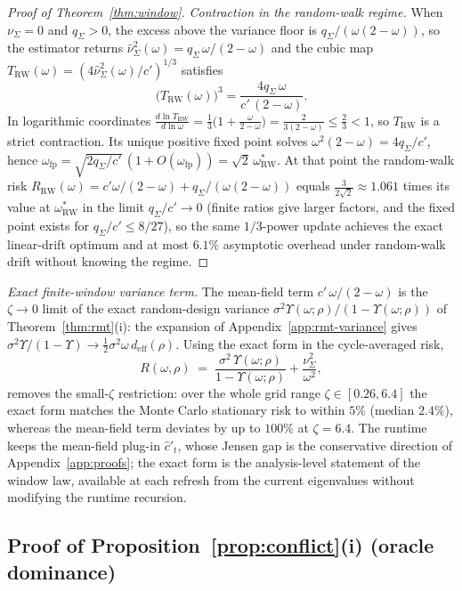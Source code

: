 \begin{proof}[Proof of Theorem~\ref{thm:window}]
\emph{Contraction in the random-walk regime.}
When $\nu_\Sigma = 0$ and $q_\Sigma > 0$, the excess above the variance floor is $q_\Sigma/(\omega(2-\omega))$, so the estimator returns $\widehat\nu^2_\Sigma(\omega) = q_\Sigma\,\omega/(2-\omega)$ and the cubic map $T_{\mathrm{RW}}(\omega) = (4\widehat\nu^2_\Sigma(\omega)/c')^{1/3}$ satisfies
\[
  \bigl(T_{\mathrm{RW}}(\omega)\bigr)^3 = \frac{4q_\Sigma\,\omega}{c'\,(2-\omega)}.
\]
In logarithmic coordinates $\frac{d\ln T_{\mathrm{RW}}}{d\ln \omega} = \frac13\bigl(1 + \frac{\omega}{2-\omega}\bigr) = \frac{2}{3(2-\omega)} \le \frac23 < 1$, so $T_{\mathrm{RW}}$ is a strict contraction.
Its unique positive fixed point solves $\omega^2(2-\omega) = 4q_\Sigma/c'$, hence $\omega_{\mathrm{fp}} = \sqrt{2q_\Sigma/c'}\,(1+O(\omega_{\mathrm{fp}})) = \sqrt2\,\omega^*_{\mathrm{RW}}$.
At that point the random-walk risk $R_{\mathrm{RW}}(\omega) = c'\omega/(2-\omega) + q_\Sigma/(\omega(2-\omega))$ equals $\frac{3}{2\sqrt2} \approx 1.061$ times its value at $\omega^*_{\mathrm{RW}}$ in the limit $q_\Sigma/c'\to 0$ (finite ratios give larger factors, and the fixed point exists for $q_\Sigma/c' \le 8/27$), so the same $1/3$-power update achieves the exact linear-drift optimum and at most $6.1\%$ asymptotic overhead under random-walk drift without knowing the regime.
\end{proof}

\medskip
\noindent\emph{Exact finite-window variance term.}
The mean-field term $c'\,\omega/(2-\omega)$ is the $\zeta \to 0$ limit of the exact random-design variance $\sigma^2\Upsilon(\omega;\rho)/(1-\Upsilon(\omega;\rho))$ of Theorem~\ref{thm:rmt}(i): the expansion of Appendix~\ref{app:rmt-variance} gives $\sigma^2\Upsilon/(1-\Upsilon) \to \tfrac12\sigma^2\omega\,d_{\mathrm{eff}}(\rho)$.
Using the exact form in the cycle-averaged risk,
\[
R(\omega,\rho) \;=\; \frac{\sigma^2\,\Upsilon(\omega;\rho)}{1-\Upsilon(\omega;\rho)} + \frac{\nu^2_\Sigma}{\omega^2},
\]
removes the small-$\zeta$ restriction: over the whole grid range $\zeta \in [0.26, 6.4]$ the exact form matches the Monte Carlo stationary risk to within $5\%$ (median $2.4\%$), whereas the mean-field term deviates by up to $100\%$ at $\zeta = 6.4$.
The runtime keeps the mean-field plug-in $\hat c'_t$, whose Jensen gap is the conservative direction of Appendix~\ref{app:proofs}; the exact form is the analysis-level statement of the window law, available at each refresh from the current eigenvalues without modifying the runtime recursion.

\subsection{Proof of Proposition~\ref{prop:conflict}(i) (oracle dominance)}
\label{app:proof-dominance}



